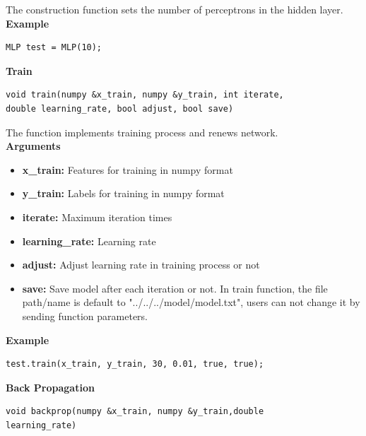 \documentclass[a4paper]{article}
\begin{document}
The construction function sets the number of perceptrons in the hidden layer.\\
\textbf{Example}
\begin{lstlisting}[language={[ANSI]C++},keywordstyle=\color{blue!70},commentstyle=\color{red!50!green!50!blue!50},frame=shadowbox, rulesepcolor=\color{red!20!green!20!blue!20}]
MLP test = MLP(10);
\end{lstlisting}
\textbf{\Large Train}
\begin{lstlisting}[language={[ANSI]C++},keywordstyle=\color{blue!70},commentstyle=\color{red!50!green!50!blue!50},frame=shadowbox, rulesepcolor=\color{red!20!green!20!blue!20}]
void train(numpy &x_train, numpy &y_train, int iterate, 
double learning_rate, bool adjust, bool save)
\end{lstlisting}

The function implements training process and renews network.\\
\textbf{Arguments}
\begin{itemize}
	\item{\textbf{x\_train:} Features for training in numpy format}
    \item{\textbf{y\_train:} Labels for training in numpy format}
    \item{\textbf{iterate:} Maximum iteration times}
    \item{\textbf{learning\_rate:} Learning rate}
    \item{\textbf{adjust:} Adjust learning rate in training process or not}
    \item{\textbf{save:} Save model after each iteration or not. In train function, the file path/name is default to "../../../model/model.txt", users can not change it by sending function parameters.}
\end{itemize}
\textbf{Example}
\begin{lstlisting}[language={[ANSI]C++},keywordstyle=\color{blue!70},commentstyle=\color{red!50!green!50!blue!50},frame=shadowbox, rulesepcolor=\color{red!20!green!20!blue!20}]
test.train(x_train, y_train, 30, 0.01, true, true);
\end{lstlisting}
\textbf{\Large Back Propagation}
\begin{lstlisting}[language={[ANSI]C++},keywordstyle=\color{blue!70},commentstyle=\color{red!50!green!50!blue!50},frame=shadowbox, rulesepcolor=\color{red!20!green!20!blue!20}]
void backprop(numpy &x_train, numpy &y_train,double 
learning_rate)
\end{lstlisting}
\end{document}
